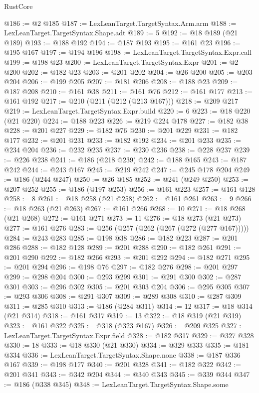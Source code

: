 \begin{lexlean}{RustCore}
\begin{coremodule}
@186 := @2 @185
@187 := LexLeanTarget.TargetSyntax.Arm.arm
@188 := LexLeanTarget.TargetSyntax.Shape.adt
@189 := 5
@192 := @18 @189 (@21 @189)
@193 := @188 @192
@194 := @187 @193
@195 := @161 @23
@196 := @195 @167
@197 := @194 @196
@198 := LexLeanTarget.TargetSyntax.Expr.call
@199 := @198 @23
@200 := LexLeanTarget.TargetSyntax.Expr
@201 := @2 @200
@202 := @182 @23
@203 := @201 @202
@204 := @26 @200
@205 := @203 @204
@206 := @199 @205
@207 := @181 @206
@208 := @188 @23
@209 := @187 @208
@210 := @161 @38
@211 := @161 @76
@212 := @161 @177
@213 := @161 @192
@217 := @210 (@211 (@212 (@213 @167)))
@218 := @209 @217
@219 := LexLeanTarget.TargetSyntax.Expr.build
@220 := 6
@223 := @18 @220 (@21 @220)
@224 := @188 @223
@226 := @219 @224 @178
@227 := @182 @38
@228 := @201 @227
@229 := @182 @76
@230 := @201 @229
@231 := @182 @177
@232 := @201 @231
@233 := @182 @192
@234 := @201 @233
@235 := @234 @204
@236 := @232 @235
@237 := @230 @236
@238 := @228 @237
@239 := @226 @238
@241 := @186 (@218 @239)
@242 := @188 @165
@243 := @187 @242
@244 := @243 @167
@245 := @219 @242
@247 := @245 @178 @204
@249 := @186 (@244 @247)
@250 := @26 @185
@252 := @241 (@249 @250)
@253 := @207 @252
@255 := @186 (@197 @253)
@256 := @161 @223
@257 := @161 @128
@258 := 8
@261 := @18 @258 (@21 @258)
@262 := @161 @261
@263 := 9
@266 := @18 @263 (@21 @263)
@267 := @161 @266
@268 := 10
@271 := @18 @268 (@21 @268)
@272 := @161 @271
@273 := 11
@276 := @18 @273 (@21 @273)
@277 := @161 @276
@283 := @256 (@257 (@262 (@267 (@272 (@277 @167)))))
@284 := @243 @283
@285 := @198 @38
@286 := @182 @223
@287 := @201 @286
@288 := @182 @128
@289 := @201 @288
@290 := @182 @261
@291 := @201 @290
@292 := @182 @266
@293 := @201 @292
@294 := @182 @271
@295 := @201 @294
@296 := @198 @76
@297 := @182 @276
@298 := @201 @297
@299 := @298 @204
@300 := @293 @299
@301 := @291 @300
@302 := @287 @301
@303 := @296 @302
@305 := @201 @303 @204
@306 := @295 @305
@307 := @293 @306
@308 := @291 @307
@309 := @289 @308
@310 := @287 @309
@311 := @285 @310
@313 := @186 (@284 @311)
@314 := 12
@317 := @18 @314 (@21 @314)
@318 := @161 @317
@319 := 13
@322 := @18 @319 (@21 @319)
@323 := @161 @322
@325 := @318 (@323 @167)
@326 := @209 @325
@327 := LexLeanTarget.TargetSyntax.Expr.field
@328 := @182 @317
@329 := @327 @328
@330 := 18
@333 := @18 @330 (@21 @330)
@334 := @329 @333
@335 := @181 @334
@336 := LexLeanTarget.TargetSyntax.Shape.none
@338 := @187 @336 @167
@339 := @198 @177
@340 := @201 @328
@341 := @182 @322
@342 := @201 @341
@343 := @342 @204
@344 := @340 @343
@345 := @339 @344
@347 := @186 (@338 @345)
@348 := LexLeanTarget.TargetSyntax.Shape.some

\end{coremodule}
\end{lexlean}
